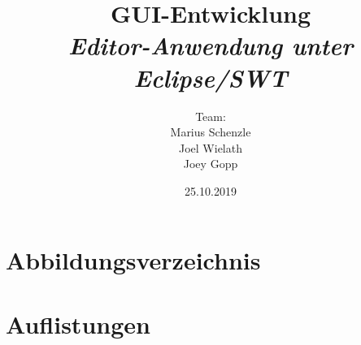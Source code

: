 

\title{\textbf{GUI-Entwicklung}\\\textit{Editor-Anwendung unter Eclipse/SWT}}
\author{Team:\\Marius Schenzle\\Joel Wielath\\Joey Gopp}
\date{25.10.2019}


\doublespacing
{}
\maketitle
\newpage
\tableofcontents
\newpage
\singlespacing
{}


\newpage


\newpage


\newpage

\section{Abbildungsverzeichnis}
\listoffigures
\newpage

\section{Auflistungen}
\lstlistoflistings



